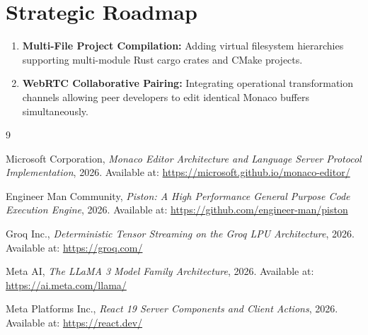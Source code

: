 \documentclass[12pt,a4paper]{report}
\begin{document}
\section{Strategic Roadmap}
\begin{enumerate}[nosep]
    \item \textbf{Multi-File Project Compilation:} Adding virtual filesystem hierarchies supporting multi-module Rust cargo crates and CMake projects.
    \item \textbf{WebRTC Collaborative Pairing:} Integrating operational transformation channels allowing peer developers to edit identical Monaco buffers simultaneously.
\end{enumerate}

\cleardoublepage
\begin{thebibliography}{9}

Microsoft Corporation, \textit{Monaco Editor Architecture and Language Server Protocol Implementation}, 2026. Available at: \url{https://microsoft.github.io/monaco-editor/}

Engineer Man Community, \textit{Piston: A High Performance General Purpose Code Execution Engine}, 2026. Available at: \url{https://github.com/engineer-man/piston}

Groq Inc., \textit{Deterministic Tensor Streaming on the Groq LPU Architecture}, 2026. Available at: \url{https://groq.com/}

Meta AI, \textit{The LLaMA 3 Model Family Architecture}, 2026. Available at: \url{https://ai.meta.com/llama/}

Meta Platforms Inc., \textit{React 19 Server Components and Client Actions}, 2026. Available at: \url{https://react.dev/}

\end{thebibliography}
\end{document}
